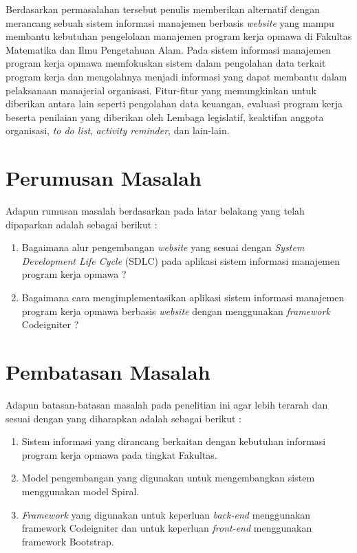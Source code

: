 Berdasarkan permasalahan tersebut penulis memberikan alternatif dengan merancang sebuah sistem informasi manajemen berbasis \emph{website} yang mampu membantu kebutuhan pengelolaan manajemen program kerja opmawa di Fakultas Matematika dan Ilmu Pengetahuan Alam. Pada sistem informasi manajemen program kerja opmawa memfokuskan sistem dalam pengolahan data terkait program kerja dan mengolahnya menjadi informasi yang dapat membantu dalam pelaksanaan manajerial organisasi. Fitur-fitur yang memungkinkan untuk diberikan antara lain seperti pengolahan data keuangan, evaluasi program kerja beserta penilaian yang diberikan oleh Lembaga legislatif, keaktifan anggota organisasi, \emph{to do list}, \emph{activity reminder}, dan lain-lain.

\section{Perumusan Masalah}
Adapun rumusan masalah berdasarkan pada latar belakang yang telah dipaparkan adalah sebagai berikut :
\begin{enumerate}
	\item Bagaimana alur pengembangan \emph{website} yang sesuai dengan \textit{System Development Life Cycle} (SDLC) pada aplikasi sistem informasi manajemen program kerja opmawa ?
	
	\item Bagaimana cara mengimplementasikan aplikasi sistem informasi manajemen program kerja opmawa berbasis \emph{website} dengan menggunakan \emph{framework} Codeigniter ?
\end{enumerate}

\section{Pembatasan Masalah}
Adapun batasan-batasan masalah pada penelitian ini agar lebih terarah dan sesuai dengan yang diharapkan adalah sebagai berikut :
\begin{enumerate}
	\item Sistem informasi yang dirancang berkaitan dengan kebutuhan informasi program kerja opmawa pada tingkat Fakultas.
	\item Model pengembangan yang digunakan untuk mengembangkan sistem menggunakan model Spiral.
	\item \textit{Framework} yang digunakan untuk keperluan \textit{back-end} menggunakan framework Codeigniter dan untuk keperluan \textit{front-end} menggunakan framework Bootstrap.
\end{enumerate}

